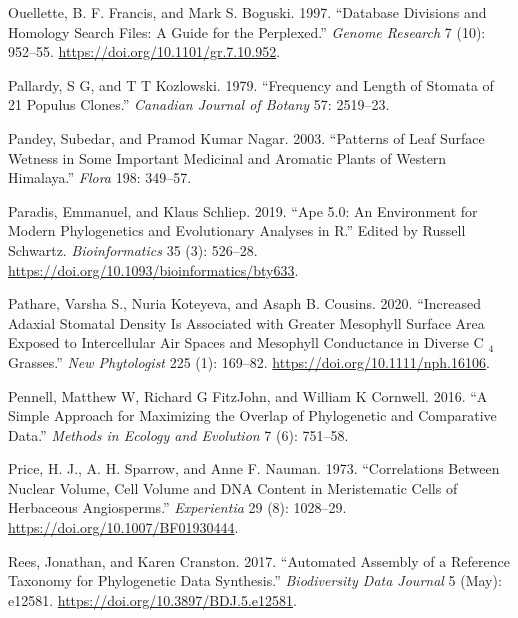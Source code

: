 \documentclass[
  12pt,
]{article}
\newlength{\cslhangindent}
\newlength{\cslentryspacingunit} %
\newenvironment{CSLReferences}[2] %
 {%
  \setlength{\parindent}{0pt}
  \ifodd #1
  \let\oldpar\par
  \def\par{\hangindent=\cslhangindent\oldpar}
  \fi
  \setlength{\parskip}{#2\cslentryspacingunit}
 }%
 {}
\begin{document}
\begin{CSLReferences}{1}{0}
\leavevmode{}%
Ouellette, B. F. Francis, and Mark S. Boguski. 1997. {``Database {Divisions} and {Homology} {Search} {Files}: {A} {Guide} for the {Perplexed}.''} \emph{Genome Research} 7 (10): 952--55. \url{https://doi.org/10.1101/gr.7.10.952}.

\leavevmode{}%
Pallardy, S G, and T T Kozlowski. 1979. {``Frequency and Length of Stomata of 21 {Populus} Clones.''} \emph{Canadian Journal of Botany} 57: 2519--23.

\leavevmode{}%
Pandey, Subedar, and Pramod Kumar Nagar. 2003. {``Patterns of Leaf Surface Wetness in Some Important Medicinal and Aromatic Plants of {Western} {Himalaya}.''} \emph{Flora} 198: 349--57.

\leavevmode{}%
Paradis, Emmanuel, and Klaus Schliep. 2019. {``Ape 5.0: An Environment for Modern Phylogenetics and Evolutionary Analyses in {R}.''} Edited by Russell Schwartz. \emph{Bioinformatics} 35 (3): 526--28. \url{https://doi.org/10.1093/bioinformatics/bty633}.

\leavevmode{}%
Pathare, Varsha S., Nuria Koteyeva, and Asaph B. Cousins. 2020. {``Increased Adaxial Stomatal Density Is Associated with Greater Mesophyll Surface Area Exposed to Intercellular Air Spaces and Mesophyll Conductance in Diverse {C} \(_{\textrm{4}}\) Grasses.''} \emph{New Phytologist} 225 (1): 169--82. \url{https://doi.org/10.1111/nph.16106}.

\leavevmode{}%
Pennell, Matthew W, Richard G FitzJohn, and William K Cornwell. 2016. {``A Simple Approach for Maximizing the Overlap of Phylogenetic and Comparative Data.''} \emph{Methods in Ecology and Evolution} 7 (6): 751--58.

\leavevmode{}%
Price, H. J., A. H. Sparrow, and Anne F. Nauman. 1973. {``Correlations Between Nuclear Volume, Cell Volume and {DNA} Content in Meristematic Cells of Herbaceous Angiosperms.''} \emph{Experientia} 29 (8): 1028--29. \url{https://doi.org/10.1007/BF01930444}.

\leavevmode{}%
Rees, Jonathan, and Karen Cranston. 2017. {``Automated Assembly of a Reference Taxonomy for Phylogenetic Data Synthesis.''} \emph{Biodiversity Data Journal} 5 (May): e12581. \url{https://doi.org/10.3897/BDJ.5.e12581}.


\end{CSLReferences}
\end{document}

